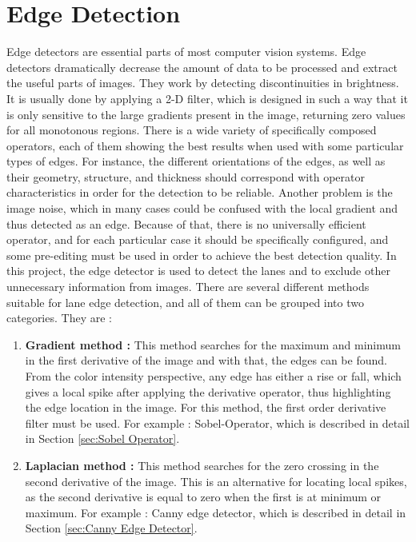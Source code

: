 %
\section{Edge Detection}\label{sec:Edge Detection}
%

Edge detectors are essential parts of most computer vision systems. Edge detectors dramatically decrease the amount of data to be processed and extract the useful parts of images. They work by detecting discontinuities in brightness. It is usually done by applying a 2-D filter, which is designed in such a way that it is only sensitive to the large gradients present in the image, returning zero values for all monotonous regions. There is a wide variety of specifically composed operators, each of them showing the best results when used with some particular types of edges. For instance, the different orientations of the edges, as well as their geometry, structure, and thickness should correspond with operator characteristics in order for the detection to be reliable. Another problem is the image noise, which in many cases could be confused with the local gradient and thus detected as an edge. Because of that, there is no universally efficient operator, and for each particular case it should be specifically configured, and some pre-editing must be used in order to achieve the best detection quality. In this project, the edge detector is used to detect the lanes and to exclude other unnecessary information from images. There are several different methods suitable for lane edge detection, and all of them can be grouped into two categories. They are :

\begin{enumerate}

\item \textbf{Gradient method : } This method searches for the maximum and minimum in the first derivative of the image and with that, the edges can be found. From the color intensity perspective, any edge has either a rise or fall, which gives a local spike after applying the derivative operator, thus highlighting the edge location in the image. For this method, the first order derivative filter must be used. For example : Sobel-Operator, which is described in detail in Section \ref{sec:Sobel Operator}.
 
\item \textbf{Laplacian method : } This method searches for the zero crossing in the second derivative of the image. This is an alternative for locating local spikes, as the second derivative is equal to zero when the first is at minimum or maximum. For example : Canny edge detector, which is described in detail in Section \ref{sec:Canny Edge Detector}. 
  
\end{enumerate}
 
